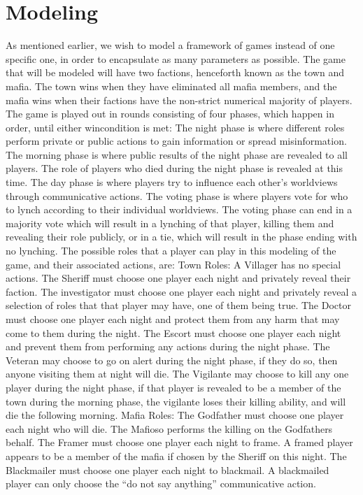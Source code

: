 \section{Modeling}
As mentioned earlier, we wish to model a framework of games instead of one
specific one, in order to encapsulate as many parameters as possible. The game
that will be modeled will have two factions, henceforth known as the town and
mafia. The town wins when they have eliminated all mafia members, and the mafia
wins when their factions have the non-strict numerical majority of players. The
game is played out in rounds consisting of four phases, which happen in order,
until either wincondition is met: The night phase is where different roles
perform private or public actions to gain information or spread misinformation.
The morning phase is where public results of the night phase are revealed to
all players. The role of players who died during the night phase is revealed at
this time. The day phase is where players try to influence each other's
worldviews through communicative actions. The voting phase is where players
vote for who to lynch according to their individual worldviews. The voting
phase can end in a majority vote which will result in a lynching of that
player, killing them and revealing their role publicly, or in a tie, which will
result in the phase ending with no lynching. The possible roles that a player
can play in this modeling of the game, and their associated actions, are: Town
Roles: A Villager has no special actions. The Sheriff must choose one player
each night and privately reveal their faction. The investigator must choose one
player each night and privately reveal a selection of roles that that player
may have, one of them being true. The Doctor must choose one player each night
and protect them from any harm that may come to them during the night. The
Escort must choose one player each night and prevent them from performing any
actions during the night phase. The Veteran may choose to go on alert during
the night phase, if they do so, then anyone visiting them at night will die.
The Vigilante may choose to kill any one player during the night phase, if that
player is revealed to be a member of the town during the morning phase, the
vigilante loses their killing ability, and will die the following morning.
Mafia Roles: The Godfather must choose one player each night who will die. The
Mafioso performs the killing on the Godfathers behalf. The Framer must choose
one player each night to frame. A framed player appears to be a member of the
mafia if chosen by the Sheriff on this night. The Blackmailer must choose one
player each night to blackmail. A blackmailed player can only choose the “do
not say anything” communicative action.

